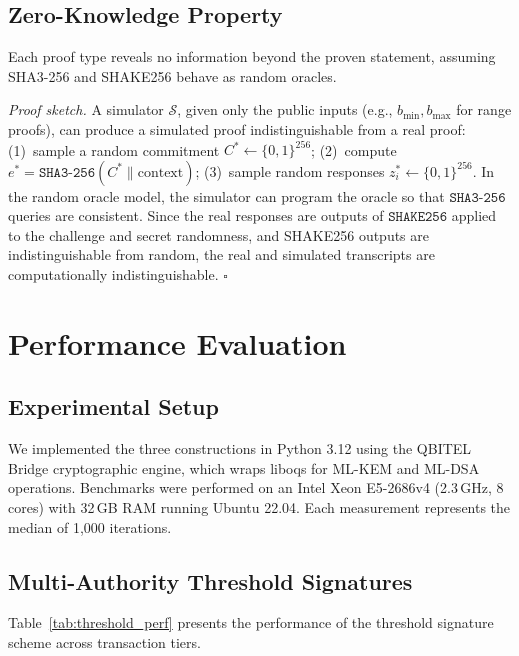 \documentclass[conference,10pt]{IEEEtran}
\newcommand{\SHAKE}{\texttt{SHAKE256}}
\newcommand{\SHA}{\texttt{SHA3-256}}
\begin{document}
\subsection{Zero-Knowledge Property}

\begin{theorem}
Each proof type reveals no information beyond the proven statement, assuming SHA3-256 and SHAKE256 behave as random oracles.
\end{theorem}

\textit{Proof sketch.} A simulator $\mathcal{S}$, given only the public inputs (e.g., $b_{\min}, b_{\max}$ for range proofs), can produce a simulated proof indistinguishable from a real proof: (1)~sample a random commitment $C^* \leftarrow \{0,1\}^{256}$; (2)~compute $e^* = \SHA(C^* \| \text{context})$; (3)~sample random responses $z_i^* \leftarrow \{0,1\}^{256}$. In the random oracle model, the simulator can program the oracle so that $\SHA$ queries are consistent. Since the real responses are outputs of $\SHAKE$ applied to the challenge and secret randomness, and SHAKE256 outputs are indistinguishable from random, the real and simulated transcripts are computationally indistinguishable. $\square$

\section{Performance Evaluation}

\subsection{Experimental Setup}

We implemented the three constructions in Python 3.12 using the QBITEL Bridge cryptographic engine, which wraps liboqs for ML-KEM and ML-DSA operations. Benchmarks were performed on an Intel Xeon E5-2686v4 (2.3\,GHz, 8 cores) with 32\,GB RAM running Ubuntu 22.04. Each measurement represents the median of 1,000 iterations.

\subsection{Multi-Authority Threshold Signatures}

Table~\ref{tab:threshold_perf} presents the performance of the threshold signature scheme across transaction tiers.
\end{document}
